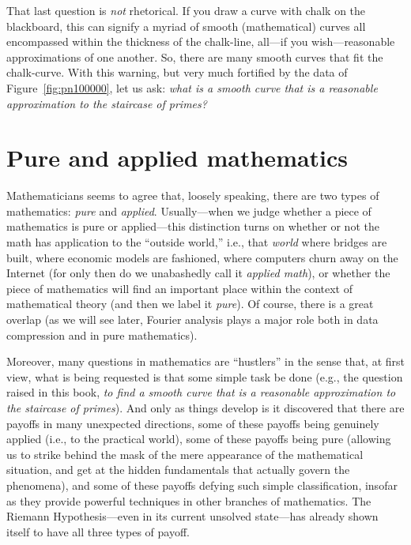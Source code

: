 \documentclass[openany]{book}
\theoremstyle{plain}
\theoremstyle{definition}
\newcommand{\RH}{Riemann Hypothesis\index{Riemann Hypothesis}}
\begin{document}
That last question is {\em not} rhetorical. If you draw a curve with
chalk on the blackboard, this can signify a myriad of smooth
(mathematical) curves all encompassed within the thickness of the
chalk-line, all---if you wish---reasonable approximations of one
another. So, there are many smooth curves that fit the chalk-curve.
With this warning, but very much fortified by the data of Figure~\ref{fig:pn100000},
let us ask: {\em what is a smooth curve that is a reasonable
  approximation to the staircase of primes?}

\chapter{Pure and applied  mathematics}\label{ch:pureapplied}

Mathematicians seems to agree that, loosely speaking, there are two
types of mathematics: {\em pure} and {\em applied}. Usually---when we
judge whether a piece of mathematics is pure or applied---this
distinction turns on whether or not the math has application to the
``outside world,'' i.e., that {\em world} where bridges are built,
where economic models are fashioned, where computers churn away on the
Internet (for only then do we unabashedly call it {\em applied math}),
or whether the piece of mathematics will find an important place
within the context of mathematical theory (and then we label it {\em
  pure}).  Of course, there is a great overlap (as we will see later,
Fourier analysis plays a major role both in data compression and in
pure mathematics).

 Moreover, many questions in
mathematics are ``hustlers'' in the sense that, at first view, what is
being requested is that some simple task be done (e.g., the question
raised in this book, {\em to find a smooth curve that is a reasonable
  approximation to the staircase of primes}).  And only as things
develop is it discovered that there are payoffs in many unexpected
directions, some of these payoffs being genuinely applied (i.e., to
the practical world), some of these payoffs being pure (allowing us
to strike behind the mask of the mere appearance of the mathematical
situation, and get at the hidden fundamentals that actually govern the
phenomena), and some of these payoffs defying such simple
classification, insofar as they provide powerful techniques in other
branches of mathematics.  The \RH{}---even in its current
unsolved state---has already shown itself to have all three types of
payoff.
\end{document}
